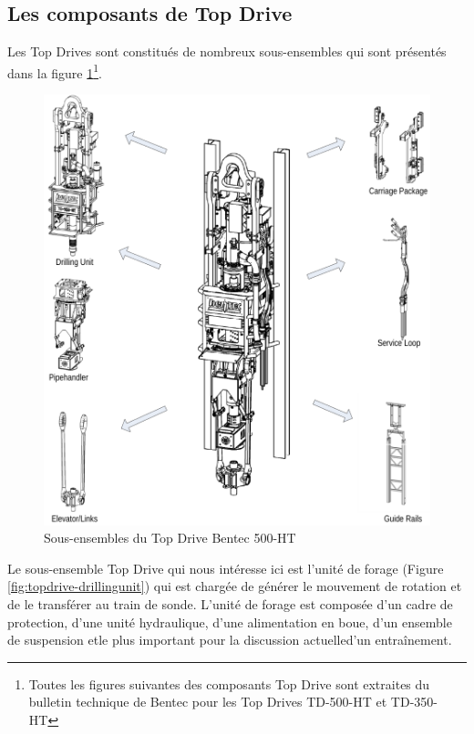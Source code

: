 \subsection{Les composants de Top Drive}%
\label{sub:top_drive_components}

Les Top Drives sont constitués de nombreux sous-ensembles qui sont présentés dans la figure \ref{fig:topdrive-subassemblies}\footnote{Toutes les figures suivantes des composants Top Drive sont extraites du bulletin technique de Bentec pour les Top Drives TD-500-HT et TD-350-HT}.

\begin{figure}[H]
	\centering
	\includegraphics[width=\linewidth]{figures/topdrive_subassemblies.png}
	\caption{Sous-ensembles du Top Drive Bentec 500-HT}%
	\label{fig:topdrive-subassemblies}
\end{figure}

Le sous-ensemble Top Drive qui nous intéresse ici est l'unité de forage (Figure \ref{fig:topdrive-drillingunit}) qui est chargée de générer le mouvement de rotation et de le transférer au train de sonde. L'unité de forage est composée d'un cadre de protection, d'une unité hydraulique, d'une alimentation en boue, d'un ensemble de suspension et\textemdash  le plus important pour la discussion actuelle\textemdash  d'un entraînement.

